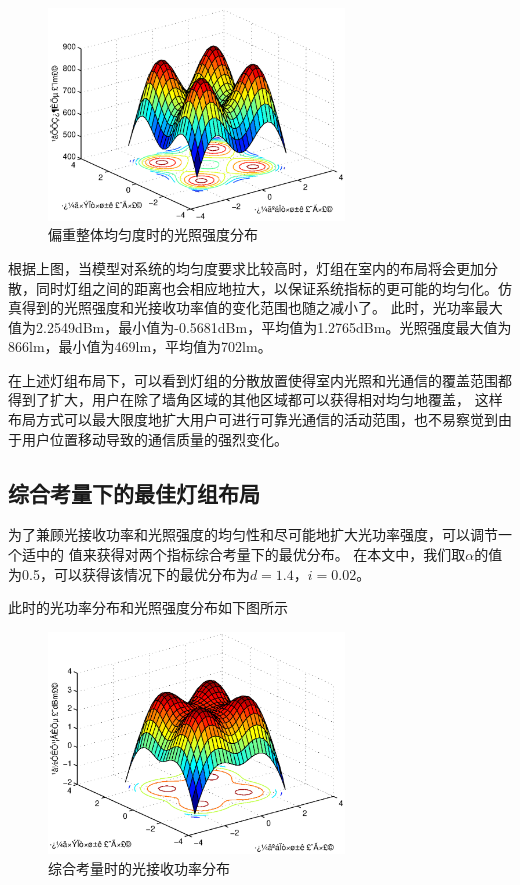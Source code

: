 \begin{figure}[htbp]
    \centering
	\includegraphics[width=0.7\textwidth]{figures/chapter-3/BalanceFirstIllu.eps}
	\caption{偏重整体均匀度时的光照强度分布}
	\label{fig:balance_first_illu}
\end{figure}

根据上图，当模型对系统的均匀度要求比较高时，灯组在室内的布局将会更加分散，同时灯组之间的距离也会相应地拉大，以保证系统指标的更可能的均匀化。仿真得到的光照强度和光接收功率值的变化范围也随之减小了。
此时，光功率最大值为2.2549dBm，最小值为-0.5681dBm，平均值为1.2765dBm。光照强度最大值为866lm，最小值为469lm，平均值为702lm。

在上述灯组布局下，可以看到灯组的分散放置使得室内光照和光通信的覆盖范围都得到了扩大，用户在除了墙角区域的其他区域都可以获得相对均匀地覆盖，
这样布局方式可以最大限度地扩大用户可进行可靠光通信的活动范围，也不易察觉到由于用户位置移动导致的通信质量的强烈变化。

\subsection{综合考量下的最佳灯组布局}
为了兼顾光接收功率和光照强度的均匀性和尽可能地扩大光功率强度，可以调节一个适中的 值来获得对两个指标综合考量下的最优分布。
在本文中，我们取$\alpha$的值为0.5，可以获得该情况下的最优分布为$d = 1.4$，$i = 0.02$。

此时的光功率分布和光照强度分布如下图所示

\begin{figure}[htbp]
    \centering
	\includegraphics[width=0.7\textwidth]{figures/chapter-3/BestPower.eps}
	\caption{综合考量时的光接收功率分布}
	\label{fig:best_power}
\end{figure}

